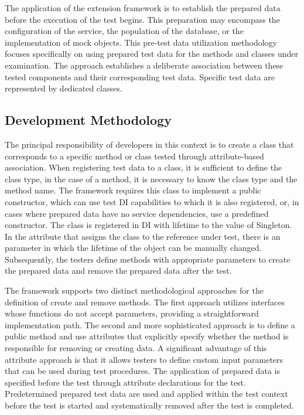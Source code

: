 The application of the extension framework is to establish the prepared data before the execution of the test begins. This preparation may encompass the configuration of the service, the population of the database, or the implementation of mock objects. This pre-test data utilization methodology focuses specifically on using prepared test data for the methods and classes under examination. The approach establishes a deliberate association between these tested components and their corresponding test data. Specific test data are represented by dedicated classes.

\subsection{Development Methodology}
The principal responsibility of developers in this context is to create a class that corresponds to a specific method or class tested through attribute-based association. When registering test data to a class, it is sufficient to define the class type, in the case of a method, it is necessary to know the class type and the method name. The framework requires this class to implement a public constructor, which can use test \ac{DI} capabilities to which it is also registered, or, in cases where prepared data have no service dependencies, use a predefined constructor. The class is registered in DI with lifetime to the value of Singleton. In the attribute that assigns the class to the reference under test, there is an parameter in which the lifetime of the object can be manually changed.
Subsequently, the testers define methods with appropriate parameters to create the prepared data and remove the prepared data after the test.

The framework supports two distinct methodological approaches for the definition of create and remove methods. The first approach utilizes interfaces whose functions do not accept parameters, providing a straightforward implementation path. The second and more sophisticated approach is to define a public method and use attributes that explicitly specify whether the method is responsible for removing or creating data. A significant advantage of this attribute approach is that it allows testers to define custom input parameters that can be used during test procedures. The application of prepared data is specified before the test through attribute declarations for the test. Predetermined prepared test data are used and applied within the test context before the test is started and systematically removed after the test is completed.

